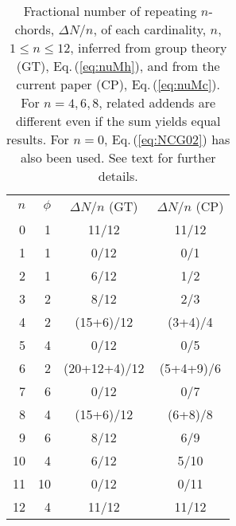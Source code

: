 \documentclass[12pt,a4paper]{article}
\begin{document}
\begin{table}
\caption{Fractional number of repeating $n$-chords, $\Delta N/n$, of each
cardinality, $n$, $1\le n\le12$, inferred from group theory (GT),
Eq.\,(\ref{eq:nuMh}), and from the current paper (CP), Eq.\,(\ref{eq:nuMc}).
For $n=4,6,8$, related addends are different even if the sum yields equal
results.   For $n=0$, Eq.\,(\ref{eq:NCG02}) has also been used.   See
text for further details.}
\label{t:core}
\begin{center}
\begin{tabular}{|r|r|c|c|} \hline
\hline
$n$ & $\phi$ & $\Delta N/n$ (GT) & $\Delta N/n$ (CP) \\
 0  &  1     &         11/12     &       11/12       \\
 1  &  1     &          0/12     &        0/1        \\
 2  &  1     &          6/12     &        1/2        \\
 3  &  2     &          8/12     &        2/3        \\
 4  &  2     &     (15+6)/12     &    (3+4)/4        \\
 5  &  4     &          0/12     &        0/5        \\
 6  &  2     &  (20+12+4)/12     &  (5+4+9)/6        \\
 7  &  6     &          0/12     &        0/7        \\
 8  &  4     &     (15+6)/12     &    (6+8)/8        \\
 9  &  6     &          8/12     &        6/9        \\
10  &  4     &          6/12     &        5/10       \\
11  & 10     &          0/12     &        0/11       \\
12  &  4     &         11/12     &       11/12       \\
\hline                            
\end{tabular}                     
\end{center}                      
\end{table}                       
%                                 
\end{document}
